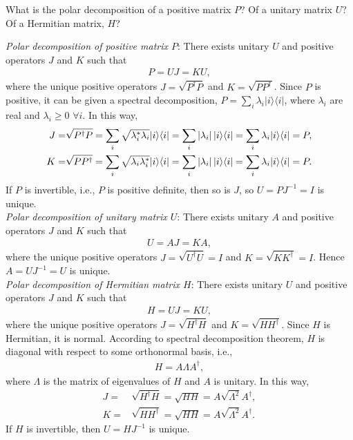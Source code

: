 \documentclass[en]{sol-man}
\begin{document}
\begin{exe}
    What is the polar decomposition of a positive matrix $P$? Of a unitary matrix $U$? Of a Hermitian matrix, $H$?
\end{exe}
\begin{sol}
    \emph{Polar decomposition of positive matrix $P$}: There exists unitary $U$ and positive operators $J$ and $K$ such that
    \begin{align}
        P=UJ=KU,
    \end{align}
    where the unique positive operators $J=\sqrt{P^{\dagger}P}$ and $K=\sqrt{PP^{\dagger}}$. Since $P$ is positive, it can be given a spectral decomposition, $P=\sum_i\lambda_i\lvert i\rangle\langle i\rvert$, where $\lambda_i$ are real and $\lambda_i\geq 0$ $\forall i$. In this way,
    \begin{align}
        J=&\sqrt{P^{\dagger}P}=\sum_i\sqrt{\lambda_i^*\lambda_i}\lvert i\rangle\langle i\rvert=\sum_i\left\lvert\lambda_i\right\rvert\lvert i\rangle\langle i\rvert=\sum_i\lambda_i\lvert i\rangle\langle i\rvert=P,\\
        K=&\sqrt{PP^{\dagger}}=\sum_i\sqrt{\lambda_i\lambda_i^*}\lvert i\rangle\langle i\rvert=\sum_i\left\lvert\lambda_i\right\rvert\lvert i\rangle\langle i\rvert=\sum_i\lambda_i\lvert i\rangle\langle i\rvert=P.
    \end{align}
    If $P$ is invertible, i.e., $P$ is positive definite, then so is $J$, so $U=PJ^{-1}=I$ is unique.\\
    \emph{Polar decomposition of unitary matrix $U$}: There exists unitary $A$ and positive operators $J$ and $K$ such that
    \begin{align}
        U=AJ=KA,
    \end{align}
    where the unique positive operators $J=\sqrt{U^{\dagger}U}=I$ and $K=\sqrt{KK^{\dagger}}=I$. Hence $A=UJ^{-1}=U$ is unique.\\
    \emph{Polar decomposition of Hermitian matrix $H$}: There exists unitary $U$ and positive operators $J$ and $K$ such that
    \begin{align}
        H=UJ=KU,
    \end{align}
    where the unique positive operators $J=\sqrt{H^{\dagger}H}$ and $K=\sqrt{HH^{\dagger}}$. Since $H$ is Hermitian, it is normal. According to spectral decomposition theorem, $H$ is diagonal with respect to some orthonormal basis, i.e.,
    \begin{align}
        H=A\Lambda A^{\dagger},
    \end{align}
    where $\Lambda$ is the matrix of eigenvalues of $H$ and $A$ is unitary. In this way,
    \begin{align}
        J=&\sqrt{H^{\dagger}H}=\sqrt{HH}=A\sqrt{\Lambda^2}A^{\dagger},\\
        K=&\sqrt{HH^{\dagger}}=\sqrt{HH}=A\sqrt{\Lambda^2}A^{\dagger}.
    \end{align}
    If $H$ is invertible, then $U=HJ^{-1}$ is unique.
\end{sol}
\end{document}
